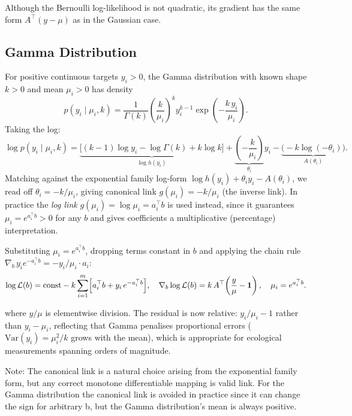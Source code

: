 \documentclass{article}
\begin{document}
Although the Bernoulli log-likelihood is not quadratic, its gradient has the same form $A^\top(y-\mu)$
as in the Gaussian case.

\subsection{Gamma Distribution}
For positive continuous targets $y_i > 0$, the Gamma distribution with known shape $k > 0$
and mean $\mu_i > 0$ has density
\[
    p(y_i \mid \mu_i, k) = \frac{1}{\Gamma(k)}\!\left(\frac{k}{\mu_i}\right)^{\!k}
    y_i^{k-1} \exp\!\left(-\frac{k\, y_i}{\mu_i}\right).
\]
Taking the log:
\[
    \log p(y_i \mid \mu_i, k)
    = \underbrace{\bigl[(k-1)\log y_i - \log\Gamma(k) + k\log k\bigr]}_{\log h(y_i)}
    + \underbrace{\left(-\frac{k}{\mu_i}\right)}_{\theta_i} y_i
    - \underbrace{\bigl(-k\log(-\theta_i)\bigr)}_{A(\theta_i)}.
\]
Matching against the exponential family log-form $\log h(y_i) + \theta_i y_i - A(\theta_i)$,
we read off $\theta_i = -k/\mu_i$, giving canonical link $g(\mu_i) = -k/\mu_i$ (the inverse link).
In practice the \emph{log link} $g(\mu_i) = \log\mu_i = a_i^\top b$ is used instead,
since it guarantees $\mu_i = e^{a_i^\top b} > 0$ for any $b$ and gives
coefficients a multiplicative (percentage) interpretation.

Substituting $\mu_i = e^{a_i^\top b}$, dropping terms constant in $b$ and applying the chain rule $\nabla_b\, y_i e^{-a_i^\top b} = -y_i/\mu_i \cdot a_i$:
\[
    \log \mathcal{L}(b)
    = \mathrm{const} - k\sum_{i=1}^{m}\Bigl[a_i^\top b + y_i\,e^{-a_i^\top b}\Bigr], \quad \nabla_b \log \mathcal{L}(b)
    = k\,A^\top\!\left(\frac{y}{\mu} - \mathbf{1}\right), \quad \mu_i = e^{a_i^\top b}.
\]
    
where $y/\mu$ is elementwise division. The residual is now relative: $y_i/\mu_i - 1$
rather than $y_i - \mu_i$, reflecting that Gamma penalises proportional errors
($\mathrm{Var}(y_i) = \mu_i^2/k$ grows with the mean), which is appropriate for
ecological measurements spanning orders of magnitude.

Note: The canonical link is a natural choice arising from the exponential family form, but any correct monotone differentiable mapping is valid link. 
For the Gamma distribution the canonical link is avoided in practice since it can change the sign for arbitrary b, but the Gamma distribution's mean is always positive.
\end{document}
